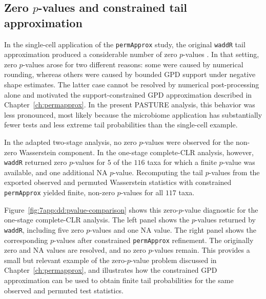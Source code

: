 \subsection{Zero $p$-values and constrained tail approximation}
\label{sec:7app:differential-distribution:zero-pvalues}

In the single-cell application of the \texttt{permApprox} study, the original \texttt{waddR} tail approximation produced a considerable number of zero $p$-values \citep{peschel2026permapprox}. In that setting, zero $p$-values arose for two different reasons: some were caused by numerical rounding, whereas others were caused by bounded GPD support under negative shape estimates. The latter case cannot be resolved by numerical post-processing alone and motivated the support-constrained GPD approximation described in Chapter~\ref{ch:permapprox}. In the present PASTURE analysis, this behavior was less pronounced, most likely because the microbiome application has substantially fewer tests and less extreme tail probabilities than the single-cell example.

In the adapted two-stage analysis, no zero $p$-values were observed for the non-zero Wasserstein component. In the one-stage complete-CLR analysis, however, \texttt{waddR} returned zero $p$-values for $5$ of the $116$ taxa for which a finite $p$-value was available, and one additional NA $p$-value. Recomputing the tail $p$-values from the exported observed and permuted Wasserstein statistics with constrained \texttt{permApprox} yielded finite, non-zero $p$-values for all $117$ taxa.


Figure~\ref{fig:7app:dd:pvalue-comparison} shows this zero-$p$-value diagnostic for the one-stage complete-CLR analysis. The left panel shows the $p$-values returned by \texttt{waddR}, including five zero $p$-values and one NA value. The right panel shows the corresponding $p$-values after constrained \texttt{permApprox} refinement. The originally zero and NA values are resolved, and no zero $p$-values remain. This provides a small but relevant example of the zero-$p$-value problem discussed in Chapter~\ref{ch:permapprox}, and illustrates how the constrained GPD approximation can be used to obtain finite tail probabilities for the same observed and permuted test statistics.

